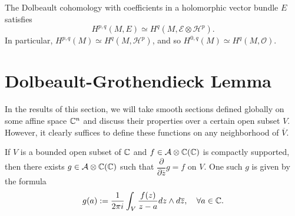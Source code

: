 \documentclass{article}
\begin{document}
\begin{corollary}
    The Dolbeault cohomology with coefficients in a holomorphic vector bundle $E$ satisfies
    \[
        H^{p,q}(M,E) \simeq H^q(M,\mathcal{E}\otimes\mathcal{H}^p).
    \]
    In particular, $H^{p,q}(M) \simeq H^q(M,\mathcal{H}^p)$, and so $H^{0,q}(M) \simeq H^q(M,\mathcal{O})$.
\end{corollary}

\section{Dolbeault-Grothendieck Lemma}

In the results of this section, we will take smooth sections defined globally on some affine space $\mathbb{C}^n$ and discuss their properties over a certain open subset $V$. However, it clearly suffices to define these functions on any neighborhood of $\overline{V}$.

\begin{lemma}\label{lem.cauchy}
    If $V$ is a bounded open subset of $\mathbb{C}$ and $f\in\mathcal{A}\otimes\mathbb{C}(\mathbb{C})$ is compactly supported, then there exists $g\in\mathcal{A}\otimes\mathbb{C}(\mathbb{C})$ such that $\dfrac{\partial}{\partial\overline{z}}g=f$ on $V$. One such $g$ is given by the formula
    \[
        g(a) := \frac{1}{2\pi i} \int_{V} \frac{f(z)}{z-a} dz\wedge d\overline{z},\quad \forall a\in\mathbb{C}.
    \]
\end{lemma}
\end{document}
